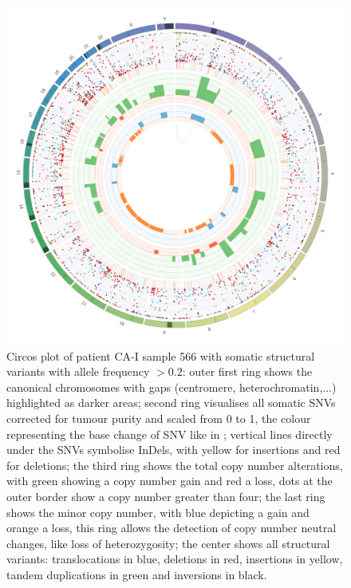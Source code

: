 \begin{figure}[ht]
\centering
\includegraphics[width=.99\linewidth]{Figures/CASCADE/CA51/CA51-566.circos.png}
\caption[Circos plot of patient CA-I sample 566]{Circos plot of patient CA-I sample 566 with somatic structural variants with allele frequency $> 0.2$: outer first ring shows the canonical chromosomes with gaps (centromere, heterochromatin,...) highlighted as darker areas; second ring visualises all somatic SNVs corrected for tumour purity and scaled from 0 to 1, the colour representing the base change of SNV like in \protect\textcite{Alexandrov2013}; vertical lines directly under the SNVs symbolise InDels, with yellow for insertions and red for deletions; the third ring shows the total copy number alterations, with green showing a copy number gain and red a loss, dots at the outer border show a copy number greater than four; the last ring shows the minor copy number, with blue depicting a gain and orange a loss, this ring allows the detection of copy number neutral changes, like loss of heterozygosity; the center shows all structural variants: translocations in blue, deletions in red, insertions in yellow, tandem duplications in green and inversions in black.} \label{fig:ca51.566circos}
\end{figure}

